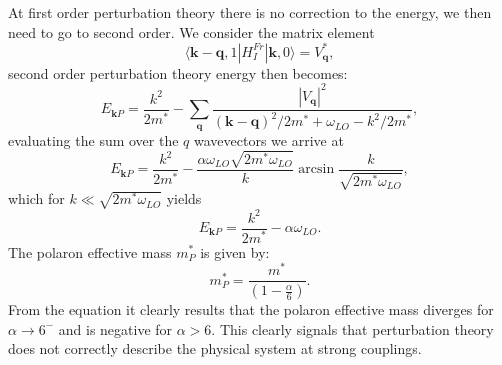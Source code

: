 At first order perturbation theory there is no correction to the energy, we then need to go to second order. We consider 
the matrix element
\begin{equation}
    \langle\mathbf{k}-\mathbf{q},1|H_I^{Fr}|\mathbf{k},0\rangle=V^*_\mathbf{q},
\end{equation}
second order perturbation theory energy then becomes:
\begin{equation}
    E_{\mathbf{k}P}=\frac{k^2}{2m^*}-\sum_{\mathbf{q}}\frac{|V_\mathbf{q}|^2}{(\mathbf{k}-\mathbf{q})^2/2m^*+\omega_{LO}-k^2/2m^*},
\end{equation}
evaluating the sum over the $q$ wavevectors we arrive at 
\begin{equation}
    E_{\mathbf{k}P}=\frac{k^2}{2m^*}-\frac{\alpha\omega_{LO}\sqrt{2m^*\omega_{LO}}}{k}\arcsin{\frac{k}{\sqrt{2m^*\omega_{LO}}}},
\end{equation}
which for $k\ll\sqrt{2m^*\omega_{LO}}$ yields
\begin{equation}
    E_{\mathbf{k}P}=\frac{k^2}{2m^*}-\alpha\omega_{LO}.
\end{equation}
The polaron effective mass $m^*_P$ is given by:
\begin{equation}
    m^*_P=\frac{m^*}{\left(1-\frac{\alpha}{6}\right)}.
\end{equation}
From the equation it clearly results that the polaron effective mass diverges for $\alpha\to 6^-$ and is negative for $\alpha>6$. This 
clearly signals that perturbation theory does not correctly describe the physical system at strong couplings.
